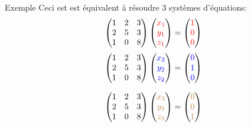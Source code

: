 \documentclass[french]{beamer}
\begin{document}
\begin{frame}{Exemple}
Ceci est est équivalent à résoudre 3 systèmes d'équations:
\[
\begin{pmatrix}
1 & 2 & 3 \\
2 & 5 & 3 \\
1 & 0 & 8
\end{pmatrix}\begin{pmatrix}
{\color{red}x_1} \\
{\color{red}y_1} \\
{\color{red}z_1}
\end{pmatrix}
=
\begin{pmatrix}
{\color{red}1} \\
{\color{red}0} \\
{\color{red}0}
\end{pmatrix}
\]
\[
\begin{pmatrix}
1 & 2 & 3 \\
2 & 5 & 3 \\
1 & 0 & 8
\end{pmatrix}\begin{pmatrix}
 {\color{blue}x_2}  \\
 {\color{blue}y_2}  \\
 {\color{blue}z_2} 
\end{pmatrix}
=
\begin{pmatrix}
 {\color{blue}0}  \\
 {\color{blue}1}  \\
 {\color{blue}0} 
\end{pmatrix}
\]

\[
\begin{pmatrix}
1 & 2 & 3 \\
2 & 5 & 3 \\
1 & 0 & 8
\end{pmatrix}\begin{pmatrix}
 {\color{brown}x_3} \\
 {\color{brown}y_3} \\
 {\color{brown}z_3}
\end{pmatrix}
=
\begin{pmatrix}
 {\color{brown}0} \\
 {\color{brown}0} \\
 {\color{brown}1}
\end{pmatrix}
\]
\end{frame}
\end{document}
